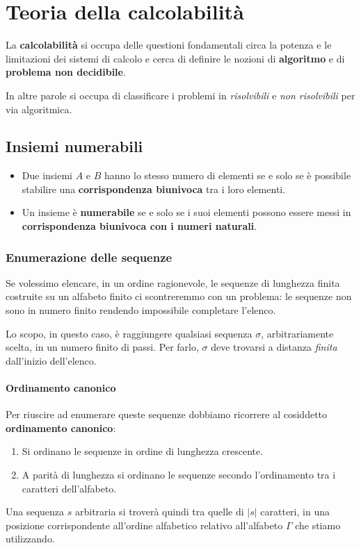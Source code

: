 \chapter{Teoria della calcolabilit\`a}\label{calcolabilita}
La \textbf{calcolabilit\`a} si occupa delle questioni fondamentali circa la potenza e le limitazioni dei sistemi di
calcolo e cerca di definire le nozioni di \textbf{algoritmo} e di \textbf{problema non decidibile}.

In altre parole si occupa di classificare i problemi in \emph{risolvibili} e \emph{non risolvibili} per via algoritmica.


\section{Insiemi numerabili}\label{insiemi_numerabili}
\begin{itemize}
	\item Due insiemi $A$ e $B$ hanno lo stesso numero di elementi se e solo se \`e possibile stabilire una
	      \textbf{corrispondenza biunivoca} tra i loro elementi.
	\item Un insieme \`e \textbf{numerabile} se e solo se i suoi elementi possono essere messi in
	      \textbf{corrispondenza biunivoca con i numeri naturali}.
\end{itemize}

\subsection{Enumerazione delle sequenze}
Se volessimo elencare, in un ordine ragionevole, le sequenze di lunghezza finita costruite su un alfabeto finito ci
scontreremmo con un problema: le sequenze non sono in numero finito rendendo impossibile completare l'elenco.

Lo scopo, in questo caso, \`e raggiungere qualsiasi sequenza $\sigma$, arbitrariamente scelta, in un numero finito di
passi. Per farlo, $\sigma$ deve trovarsi a distanza \emph{finita} dall'inizio dell'elenco.

\subsubsection{Ordinamento canonico}
Per riuscire ad enumerare queste sequenze dobbiamo ricorrere al cosiddetto \textbf{ordinamento canonico}:
\begin{enumerate}
	\item Si ordinano le sequenze in ordine di lunghezza crescente.
	\item A parit\`a di lunghezza si ordinano le sequenze secondo l'ordinamento tra i caratteri dell'alfabeto.
\end{enumerate}
Una sequenza $s$ arbitraria si trover\`a quindi tra quelle di $| s |$ caratteri, in una posizione corrispondente
all'ordine alfabetico relativo all'alfabeto $\Gamma$ che stiamo utilizzando.

